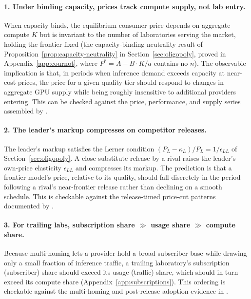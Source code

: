 \documentclass[11pt]{article}
\begin{document}
\paragraph{1. Under binding capacity, prices track compute supply, not lab entry.} When capacity binds, the equilibrium consumer price depends on aggregate compute $K$ but is invariant to the number of laboratories serving the market, holding the frontier fixed (the capacity-binding neutrality result of Proposition~\ref{prop:capacity-neutrality} in Section~\ref{sec:oligopoly}, proved in Appendix~\ref{app:cournot}, where $P^*=A-B\cdot K/a$ contains no $n$). The observable implication is that, in periods when inference demand exceeds capacity at near-cost prices, the price for a given quality tier should respond to changes in aggregate GPU supply while being roughly insensitive to additional providers entering. This can be checked against the price, performance, and supply series assembled by \citet{demirerEtAl2025}.

\paragraph{2. The leader's markup compresses on competitor releases.} The leader's markup satisfies the Lerner condition $(P_L-\kappa_L)/P_L=1/\epsilon_{LL}$ of Section~\ref{sec:oligopoly}. A close-substitute release by a rival raises the leader's own-price elasticity $\epsilon_{LL}$ and compresses its markup. The prediction is that a frontier model's price, relative to its quality, should fall discretely in the period following a rival's near-frontier release rather than declining on a smooth schedule. This is checkable against the release-timed price-cut patterns documented by \citet{demirerEtAl2025}.

\paragraph{3. For trailing labs, subscription share $\gg$ usage share $\gg$ compute share.} Because multi-homing lets a provider hold a broad subscriber base while drawing only a small fraction of inference traffic, a trailing laboratory's subscription (subscriber) share should exceed its usage (traffic) share, which should in turn exceed its compute share (Appendix~\ref{app:subscriptions}). This ordering is checkable against the multi-homing and post-release adoption evidence in \citet{fradkin2025demand}.
\end{document}
